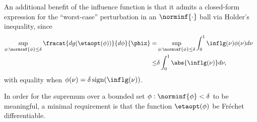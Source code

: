 An additional benefit of the influence function is that it admits a closed-form
expression for the ``worst-case'' perturbation in an $\norminf{\cdot}$ ball
via Holder's inequality, since
%
\begin{align*}
%
\sup_{\phi: \norminf{\phi} \le \delta}
    \fracat{d g(\etaopt(\phi))}{d \phi}{\phiz} =&{}
\sup_{\phi: \norminf{\phi} \le \delta}
    \int_0^1 \inflg(\nu) \phi(\nu) d\nu \\
\le&{} \delta \int_0^1 \abs{\inflg(\nu) }d\nu,
%
\end{align*}
%
with equality when $\phi(\nu) = \delta \, \mathrm{sign}(\inflg(\nu))$.

In order for the supremum over a bounded set $\phi: \norminf{\phi} < \delta$
to be meaningful, a minimal requirement is that the function $\etaopt(\phi)$
be Fr{\'e}chet differentiable.
